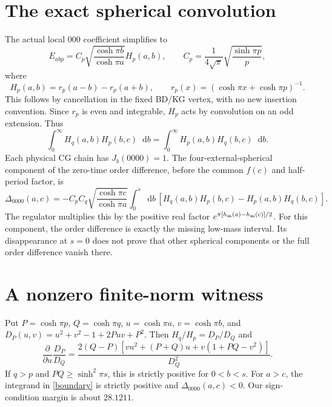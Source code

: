 \documentclass[11pt,a4paper]{article}
\newcommand{\dd}{\mathop{}\!\mathrm d}
\newcommand{\hh}{h_{\rm m}}
\begin{document}
\section{The exact spherical convolution}
The actual local $000$ coefficient simplifies to
\begin{equation}
 E_{abp}=C_p\sqrt{\frac{\cosh\pi b}{\cosh\pi a}}H_p(a,b),
 \qquad C_p=\frac1{4\sqrt\pi}\sqrt{\frac{\sinh\pi p}{p}},
 \label{emission}
\end{equation}
where
\[
 H_p(a,b)=r_p(a-b)-r_p(a+b),\qquad
 r_p(x)=(\cosh\pi x+\cosh\pi p)^{-1}.
\]
This follows by cancellation in the fixed BD/KG vertex, with no new
insertion convention. Since $r_p$ is even and integrable, $H_p$
acts by convolution on an odd extension. Thus
\begin{equation}
 \int_0^\infty H_q(a,b)H_p(b,c)\dd b
 =\int_0^\infty H_p(a,b)H_q(b,c)\dd b . \label{oddcommute}
\end{equation}
Each physical CG chain has $J_b(0000)=1$. The four-external-spherical
component of the zero-time order difference, before the common
$f(c)$ and half-period factor, is
\begin{equation}
 \Delta_{0000}(a,c)=
 -C_pC_q\sqrt{\frac{\cosh\pi c}{\cosh\pi a}}
 \int_0^s\!\dd b\,
 [H_q(a,b)H_p(b,c)-H_p(a,b)H_q(b,c)]. \label{boundary}
\end{equation}
The regulator multiplies this by the positive real factor
$e^{\pi[\hh(a)-\hh(c)]/2}$.
For this component, the order difference is exactly the missing
low-mass interval. Its disappearance at $s=0$ does not prove that
other spherical components or the full order difference vanish there.

\section{A nonzero finite-norm witness}
Put $P=\cosh\pi p$, $Q=\cosh\pi q$, $u=\cosh\pi a$, $v=\cosh\pi b$,
and $D_P(u,v)=u^2+v^2-1+2Puv+P^2$.
Then $H_q/H_p=D_P/D_Q$ and
\begin{equation}
 \frac{\partial}{\partial u}\frac{D_P}{D_Q}
 =\frac{2(Q-P)[vu^2+(P+Q)u+v(1+PQ-v^2)]}{D_Q^2}. \label{monotone}
\end{equation}
If $q>p$ and $PQ\ge\sinh^2\pi s$, this is strictly positive for
$0<b<s$. For $a>c$, the integrand in \eqref{boundary} is strictly
positive and $\Delta_{0000}(a,c)<0$.
Our sign-condition margin is about $28.1211$.
\end{document}
